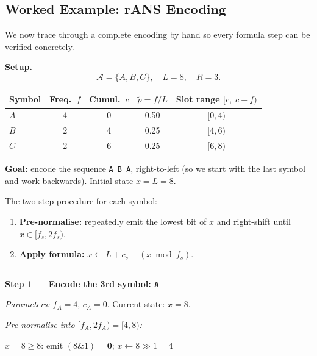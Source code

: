 \subsection{Worked Example: rANS Encoding}

We now trace through a complete encoding by hand so every
formula step can be verified concretely.

\begin{examplebox}
\textbf{Setup.}
\[
  \mathcal{A} = \{A, B, C\},\quad L = 8,\quad R = 3.
\]

\smallskip
\begin{center}
\begin{tabular}{@{}lcccc@{}}
\toprule
Symbol & Freq.\ $f$ & Cumul.\ $c$ & $\tilde{p}=f/L$ & Slot range $[c,\;c+f)$ \\
\midrule
$A$ & 4 & 0 & 0.50 & $[0,4)$ \\
$B$ & 2 & 4 & 0.25 & $[4,6)$ \\
$C$ & 2 & 6 & 0.25 & $[6,8)$ \\
\bottomrule
\end{tabular}
\end{center}

\medskip
\noindent\textbf{Goal:} encode the sequence \texttt{A B A},
right-to-left (so we start with the last symbol and work
backwards).  Initial state $x = L = 8$.

\medskip
The two-step procedure for each symbol:
\begin{enumerate}
  \item \textbf{Pre-normalise:} repeatedly emit the lowest
        bit of $x$ and right-shift until $x \in [f_s, 2f_s)$.
  \item \textbf{Apply formula:}
        $x \leftarrow L + c_s + (x \bmod f_s)$.
\end{enumerate}

\medskip\hrule\medskip

\noindent\textbf{Step 1 --- Encode the 3rd symbol: \texttt{A}}

\noindent\emph{Parameters:} $f_A = 4$, $c_A = 0$.
Current state: $x = 8$.

\noindent\emph{Pre-normalise into $[f_A, 2f_A) = [4, 8)$:}
\begin{algorithmic}[1]
    \State $x = 8 \ge 8$: \enspace emit $(8 \mathrel{\&} 1) = \mathbf{0}$;\enspace
           $x \leftarrow 8 \gg 1 = 4$
\EndWhile
\Comment{$4 \in [4,8)$: stop}
\end{algorithmic}


\end{examplebox}
